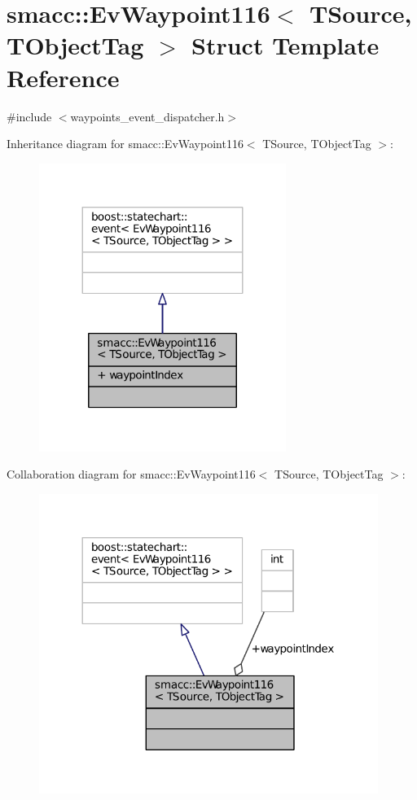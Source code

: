 \hypertarget{structsmacc_1_1EvWaypoint116}{}\section{smacc\+:\+:Ev\+Waypoint116$<$ T\+Source, T\+Object\+Tag $>$ Struct Template Reference}
\label{structsmacc_1_1EvWaypoint116}


{\ttfamily \#include $<$waypoints\+\_\+event\+\_\+dispatcher.\+h$>$}



Inheritance diagram for smacc\+:\+:Ev\+Waypoint116$<$ T\+Source, T\+Object\+Tag $>$\+:
\nopagebreak
\begin{figure}[H]
\begin{center}
\leavevmode
\includegraphics[width=227pt]{structsmacc_1_1EvWaypoint116__inherit__graph}
\end{center}
\end{figure}


Collaboration diagram for smacc\+:\+:Ev\+Waypoint116$<$ T\+Source, T\+Object\+Tag $>$\+:
\nopagebreak
\begin{figure}[H]
\begin{center}
\leavevmode
\includegraphics[width=312pt]{structsmacc_1_1EvWaypoint116__coll__graph}
\end{center}
\end{figure}
